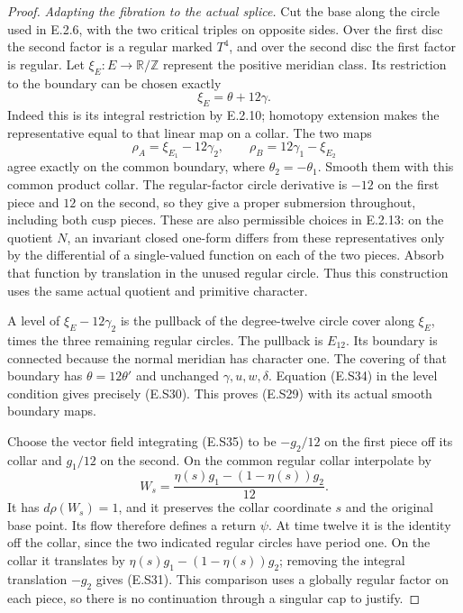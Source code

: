 \begin{proof}
\emph{Adapting the fibration to the actual splice.}
Cut the base along the circle used in E.2.6, with the two
critical triples on opposite sides. Over the first disc the
second factor is a regular marked $T^4$, and over the second
disc the first factor is regular. Let
$\xi_E:E\to\mathbb R/\mathbb Z$ represent the positive
meridian class. Its restriction to the boundary can be
chosen exactly
\[
                         \xi_E=\theta+12\gamma.
 \tag{E.S34}
\]
Indeed this is its integral restriction by E.2.10; homotopy
extension makes the representative equal to that linear
map on a collar. The two maps
\[
        \rho_A=\xi_{E_1}-12\gamma_2,
             \qquad \rho_B=12\gamma_1-\xi_{E_2}
 \tag{E.S35}
\]
agree exactly on the common boundary, where
$\theta_2=-\theta_1$. Smooth them with this common product
collar. The regular-factor circle derivative is $-12$ on
the first piece and $12$ on the second, so they give a
proper submersion throughout, including both cusp pieces.
These are also permissible choices in E.2.13: on the
quotient $N$, an invariant closed one-form differs from
these representatives only by the differential of a
single-valued function on each of the two pieces. Absorb
that function by translation in the unused regular circle.
Thus this construction uses the same actual quotient and
primitive character.

A level of $\xi_E-12\gamma_2$ is the pullback of the
degree-twelve circle cover along $\xi_E$, times the three
remaining regular circles. The pullback is $E_{12}$.
Its boundary is connected because the normal meridian has
character one. The covering of that boundary has
$\theta=12\theta'$ and unchanged $\gamma,u,w,\delta$.
Equation (E.S34) in the level condition gives precisely
(E.S30). This proves (E.S29) with its actual smooth
boundary maps.

Choose the vector field integrating (E.S35) to be
$-g_2/12$ on the first piece off its collar and $g_1/12$
on the second. On the common regular collar interpolate by
\[
                     W_s=\frac{\eta(s)g_1-(1-\eta(s))g_2}{12}.
 \tag{E.S36}
\]
It has $d\rho(W_s)=1$, and it preserves the collar
coordinate $s$ and the original base point. Its flow
therefore defines a return $\psi$. At time twelve it is
the identity off the collar, since the two indicated
regular circles have period one. On the collar it
translates by $\eta(s)g_1-(1-\eta(s))g_2$; removing the
integral translation $-g_2$ gives (E.S31). This comparison
uses a globally regular factor on each piece, so there
is no continuation through a singular cap to justify.


\end{proof}
